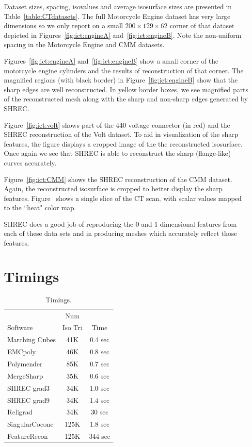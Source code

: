 Dataset sizes, spacing, isovalues and average isosurface sizes are presented
in Table~\ref{table:CTdatasets}.
The full Motorcycle Engine dataset has very large dimensions
so we only report on a small $200 \times 129 \times 62$ corner 
of that dataset depicted in Figures~\ref{fig:ict:engineA} 
and~\ref{fig:ict:engineB}.
Note the non-uniform spacing in the Motorcycle Engine and CMM datasets.

Figures~\ref{fig:ict:engineA} and~\ref{fig:ict:engineB} 
show a small corner of the motorcycle engine cylinders
and the results of reconstruction of that corner.
The magnified regions (with black border) in Figure~\ref{fig:ict:engineB}
show that the sharp edges are well reconstructed. 
In yellow border boxes, we see magnified parts
of the reconstructed mesh along with the sharp and non-sharp edges
generated by SHREC.

Figure~\ref{fig:ict:volt} shows part of the 440 voltage connector (in red)
and the SHREC reconstruction of the Volt dataset.
To aid in visualization of the sharp features,
the figure displays a cropped image of the the reconstructed isosurface.
Once again we see that SHREC is able to reconstruct 
the sharp (flange-like) curves accurately.

Figure~\ref{fig:ict:CMM} shows the SHREC reconstruction of the CMM dataset.
Again, the reconstructed isosurface is cropped to better
display the sharp features.
Figure~\protect{} shows a single slice of
the CT scan, with scalar values mapped to the ``heat" color map.

SHREC does a good job of reproducing the 0 and 1 dimensional features
from each of these data sets
and in producing meshes which accurately reflect those features.


\section{Timings}
\begin{table}[h]
	\centering
	\begin{tabular}{|l|c|c|}\hline
             & Num & \\ 
		Software & Iso Tri & Time \\ \hline
		Marching Cubes & 41K & 0.4  sec \\ 
		EMCpoly & 46K & 0.8 sec \\
		Polymender & 85K & 0.7 sec \\
		MergeSharp & 35K & 0.6 sec \\
		SHREC grad3 & 34K & 1.0 sec \\
		SHREC grad9 & 34K &  1.4 sec \\
		Religrad & 34K & 30 sec \\
		SingularCocone & 125K & 1.8 sec  \\
		FeatureRecon & 125K & 344 sec  \\
\hline
	\end{tabular}
\caption{Timings.}

\label{table:timings}

\end{table}


